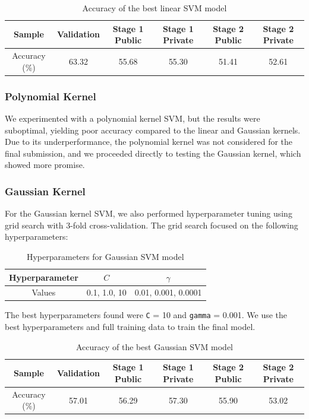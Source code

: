 \documentclass[10pt,a4paper]{article}
\begin{document}
\begin{table}[H]
  \centering
  \begin{tabular}{|c|c|c|c|c|c|}
  \hline
  Sample & Validation & Stage 1 Public & Stage 1 Private & Stage 2 Public & Stage 2 Private \\ \hline
  Accuracy (\%) & 63.32 & 55.68 & 55.30 & 51.41 & 52.61 \\ \hline
  \end{tabular}
  \caption{Accuracy of the best linear SVM model}
\end{table}


\subsubsection{Polynomial Kernel}
We experimented with a polynomial kernel SVM, but the results were suboptimal, yielding poor accuracy compared to the linear and Gaussian kernels. Due to its underperformance, the polynomial kernel was not considered for the final submission, and we proceeded directly to testing the Gaussian kernel, which showed more promise.


\subsubsection{Gaussian Kernel}
For the Gaussian kernel SVM, we also performed hyperparameter tuning using grid search with 3-fold cross-validation. The grid search focused on the following hyperparameters:

\begin{table}[H]
  \centering
  \begin{tabular}{|c|c|c|}
  \hline
  Hyperparameter & $C$ & $\gamma$ \\ \hline
  Values & 0.1, 1.0, 10 & 0.01, 0.001, 0.0001 \\ \hline
  \end{tabular}
  \caption{Hyperparameters for Gaussian SVM model}
\end{table}

The best hyperparameters found were \texttt{C} = 10 and \texttt{gamma} = 0.001. We use the best hyperparameters and full training data to train the final model.

\begin{table}[H]
  \centering
  \begin{tabular}{|c|c|c|c|c|c|}
  \hline
  Sample & Validation & Stage 1 Public & Stage 1 Private & Stage 2 Public & Stage 2 Private \\ \hline
  Accuracy (\%) & 57.01 & 56.29 & 57.30 & 55.90 & 53.02 \\ \hline
  \end{tabular}
  \caption{Accuracy of the best Gaussian SVM model}
\end{table}
\end{document}
